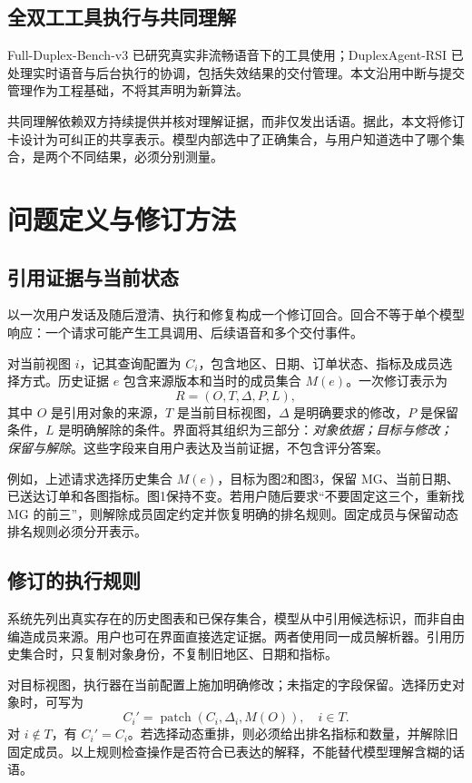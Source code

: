 \documentclass[conference]{IEEEtran}
\begin{document}
\subsection{全双工工具执行与共同理解}
Full-Duplex-Bench-v3 已研究真实非流畅语音下的工具使用\cite{fdbv3}；DuplexAgent-RSI 已处理实时语音与后台执行的协调，包括失效结果的交付管理\cite{duplexagent}。本文沿用中断与提交管理作为工程基础，不将其声明为新算法。

共同理解依赖双方持续提供并核对理解证据，而非仅发出话语\cite{grounding}。据此，本文将修订卡设计为可纠正的共享表示。模型内部选中了正确集合，与用户知道选中了哪个集合，是两个不同结果，必须分别测量。

\section{问题定义与修订方法}
\subsection{引用证据与当前状态}
以一次用户发话及随后澄清、执行和修复构成一个修订回合。回合不等于单个模型响应：一个请求可能产生工具调用、后续语音和多个交付事件。

对当前视图 $i$，记其查询配置为 $C_i$，包含地区、日期、订单状态、指标及成员选择方式。历史证据 $e$ 包含来源版本和当时的成员集合 $M(e)$。一次修订表示为
\begin{equation}
R=(O,T,\Delta,P,L),
\end{equation}
其中 $O$ 是引用对象的来源，$T$ 是当前目标视图，$\Delta$ 是明确要求的修改，$P$ 是保留条件，$L$ 是明确解除的条件。界面将其组织为三部分：\emph{对象依据；目标与修改；保留与解除}。这些字段来自用户表达及当前证据，不包含评分答案。

例如，上述请求选择历史集合 $M(e)$，目标为图2和图3，保留 MG、当前日期、已送达订单和各图指标。图1保持不变。若用户随后要求“不要固定这三个，重新找 MG 的前三”，则解除成员固定约定并恢复明确的排名规则。固定成员与保留动态排名规则必须分开表示。

\subsection{修订的执行规则}
系统先列出真实存在的历史图表和已保存集合，模型从中引用候选标识，而非自由编造成员来源。用户也可在界面直接选定证据。两者使用同一成员解析器。引用历史集合时，只复制对象身份，不复制旧地区、日期和指标。

对目标视图，执行器在当前配置上施加明确修改；未指定的字段保留。选择历史对象时，可写为
\begin{equation}
C_i'=\operatorname{patch}(C_i,\Delta_i,M(O)),\quad i\in T.
\end{equation}
对 $i\notin T$，有 $C_i'=C_i$。若选择动态重排，则必须给出排名指标和数量，并解除旧固定成员。以上规则检查操作是否符合已表达的解释，不能替代模型理解含糊的话语。
\end{document}
